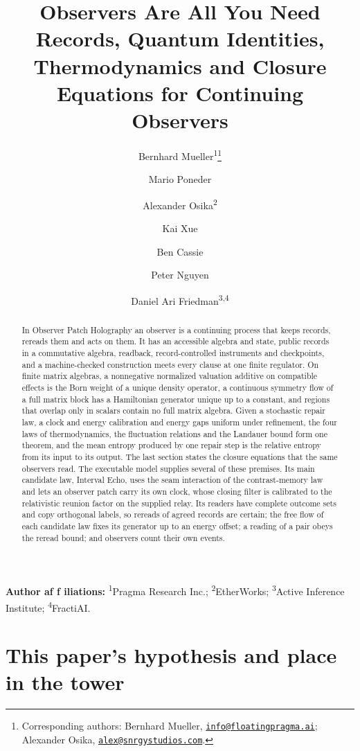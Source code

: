 \documentclass[11pt]{article}
\title{Observers Are All You Need\\[0.4em]\large Records, Quantum Identities, Thermodynamics and Closure Equations for Continuing Observers}
\author{Bernhard Mueller\textsuperscript{1}\thanks{\protect\raggedright Corresponding authors: Bernhard Mueller,
\href{mailto:info@floatingpragma.ai}{\texttt{info@floatingpragma.ai}};
Alexander Osika, \href{mailto:alex@snrgystudios.com}{\texttt{alex@snrgystudios.com}}.}
\and Mario Poneder \and Alexander Osika\textsuperscript{2} \and Kai Xue \and Ben Cassie \and Peter Nguyen \and Daniel Ari Friedman\textsuperscript{3,4}}
\date{\OPHPaperReleaseDate}
\begin{document}
\maketitle
\OPHPaperReleaseBanner

\begin{center}
\small\textbf{Author af\kern0pt f\kern0pt iliations:} \textsuperscript{1}Pragma Research Inc.; \textsuperscript{2}EtherWorks; \textsuperscript{3}Active Inference Institute; \textsuperscript{4}FractiAI.
\end{center}

\begin{abstract}
In Observer Patch Holography an observer is a continuing process that keeps
records, rereads them and acts on them. It has an accessible algebra and
state, public records in a commutative algebra, readback, record-controlled
instruments and checkpoints, and a machine-checked construction meets every
clause at one finite regulator. On finite matrix algebras, a nonnegative
normalized valuation additive on compatible effects is the Born weight of a
unique density operator, a continuous symmetry flow of a full matrix block
has a Hamiltonian generator unique up to a constant, and regions that
overlap only in scalars contain no full matrix algebra. Given a stochastic
repair law, a clock and energy calibration and energy gaps uniform under
refinement, the four laws of thermodynamics, the fluctuation relations and
the Landauer bound form one theorem, and the mean entropy produced by one
repair step is the relative entropy from its input to its output. The last
section states the closure equations that the same observers read. The
executable model supplies several of these premises. Its main candidate law,
Interval Echo, uses the seam interaction of the contrast-memory law and lets
an observer patch carry its own clock, whose closing filter is calibrated to the relativistic reunion factor on the supplied relay. Its readers have complete outcome sets
and copy orthogonal labels, so rereads of agreed records are certain; the
free flow of each candidate law fixes its generator up to an energy offset;
a reading of a pair obeys the reread bound; and observers count their own
events.
\end{abstract}



\section*{This paper's hypothesis and place in the tower}
\label{sec:observers-hypothesis}
\end{document}
